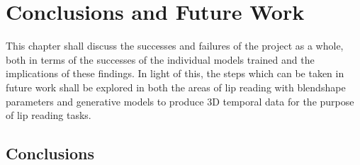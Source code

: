 \chapter{Conclusions and Future Work}

This chapter shall discuss the successes and failures of the project as a whole, both in terms of the successes of the individual models trained and the implications of these findings.
In light of this, the steps which can be taken in future work shall be explored in both the areas of lip reading with blendshape parameters and generative models to produce 3D temporal data for the purpose of lip reading tasks.

\section{Conclusions}

